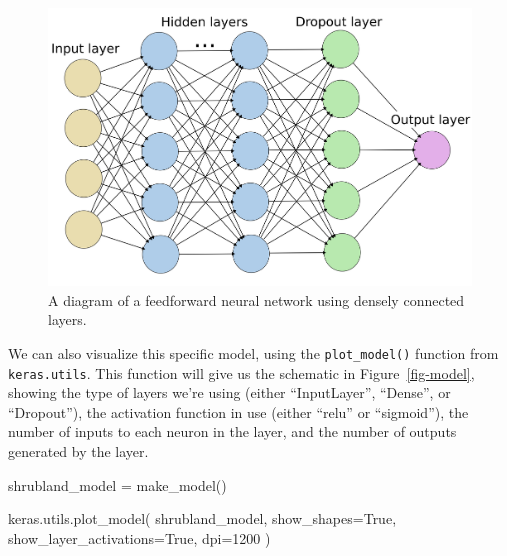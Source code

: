 \documentclass[
  letterpaper,
  DIV=11,
  numbers=noendperiod]{scrartcl}
\newenvironment{Shaded}{\begin{snugshade}}{\end{snugshade}}
\newcommand{\DecValTok}[1]{\textcolor[rgb]{0.68,0.00,0.00}{#1}}
\newcommand{\NormalTok}[1]{\textcolor[rgb]{0.00,0.23,0.31}{#1}}
\newcommand{\OperatorTok}[1]{\textcolor[rgb]{0.37,0.37,0.37}{#1}}
\newcommand{\VariableTok}[1]{\textcolor[rgb]{0.07,0.07,0.07}{#1}}
\begin{document}
\begin{figure}

{\centering \includegraphics[width=1\textwidth,height=\textheight]{figures/diagram.png}

}

\caption{\label{fig-diagram}A diagram of a feedforward neural network
using densely connected layers.}

\end{figure}

We can also visualize this specific model, using the
\texttt{plot\_model()} function from \texttt{keras.utils}. This function
will give us the schematic in Figure~\ref{fig-model}, showing the type
of layers we're using (either ``InputLayer'', ``Dense'', or
``Dropout''), the activation function in use (either ``relu'' or
``sigmoid''), the number of inputs to each neuron in the layer, and the
number of outputs generated by the layer.

\begin{Shaded}
\begin{Highlighting}[]
\NormalTok{shrubland\_model }\OperatorTok{=}\NormalTok{ make\_model()}

\NormalTok{keras.utils.plot\_model(}
\NormalTok{  shrubland\_model, show\_shapes}\OperatorTok{=}\VariableTok{True}\NormalTok{, show\_layer\_activations}\OperatorTok{=}\VariableTok{True}\NormalTok{, dpi}\OperatorTok{=}\DecValTok{1200}
\NormalTok{)}
\end{Highlighting}
\end{Shaded}
\end{document}
